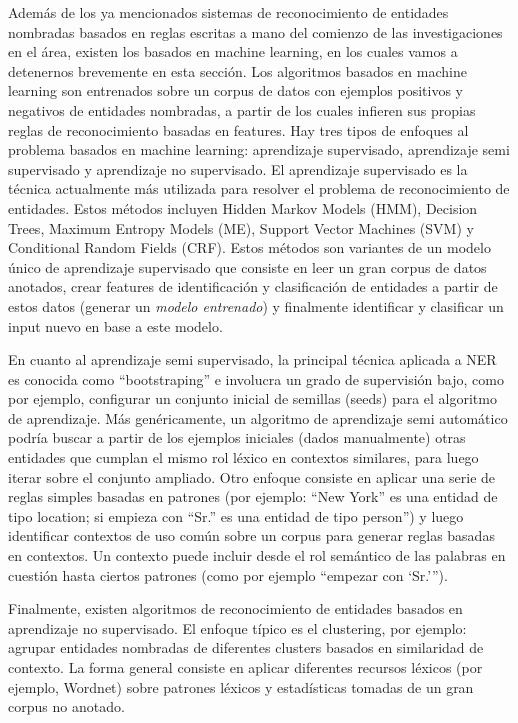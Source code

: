 Además de los ya mencionados sistemas de reconocimiento de entidades nombradas basados en reglas escritas a mano del comienzo de las investigaciones en el área, existen los basados en machine learning, en los cuales vamos a detenernos brevemente en esta sección. Los algoritmos basados en machine learning son entrenados sobre un corpus de datos con ejemplos positivos y negativos de entidades nombradas, a partir de los cuales infieren sus propias reglas de reconocimiento basadas en features. Hay tres tipos de enfoques al problema basados en machine learning: aprendizaje supervisado, aprendizaje semi supervisado y aprendizaje no supervisado.
El aprendizaje supervisado es la técnica actualmente más utilizada para resolver el problema de reconocimiento de entidades. Estos métodos incluyen Hidden Markov Models (HMM), Decision Trees, Maximum Entropy Models (ME), Support Vector Machines (SVM)  y Conditional Random Fields (CRF). Estos métodos son variantes de un modelo único de aprendizaje supervisado que consiste en leer un gran corpus de datos anotados, crear features de identificación y clasificación de entidades a partir de estos datos (generar un \textit{modelo entrenado}) y finalmente identificar y clasificar un input nuevo en base a este modelo.

En cuanto al aprendizaje semi supervisado, la principal técnica aplicada a NER es conocida como “bootstraping” e involucra un grado de supervisión bajo, como por ejemplo, configurar un conjunto inicial de semillas (seeds) para el algoritmo de aprendizaje. Más genéricamente, un algoritmo de aprendizaje semi automático podría buscar a partir de los ejemplos iniciales (dados manualmente) otras entidades que cumplan el mismo rol léxico en contextos similares, para luego iterar sobre el conjunto ampliado.
Otro enfoque consiste en aplicar una serie de reglas simples basadas en patrones (por ejemplo: “New York” es una entidad de tipo location; si empieza con “Sr.” es una entidad de tipo person”) y luego identificar contextos de uso común sobre un corpus para generar reglas basadas en contextos. Un contexto puede incluir desde el rol semántico de las palabras en cuestión hasta ciertos patrones (como por ejemplo “empezar con ‘Sr.’”).

Finalmente, existen algoritmos de reconocimiento de entidades basados en aprendizaje no supervisado. El enfoque típico es el clustering, por ejemplo: agrupar entidades nombradas de diferentes clusters basados en similaridad de contexto.  La forma general consiste en aplicar diferentes recursos léxicos (por ejemplo, Wordnet) sobre patrones léxicos y estadísticas tomadas de un gran corpus no anotado.


